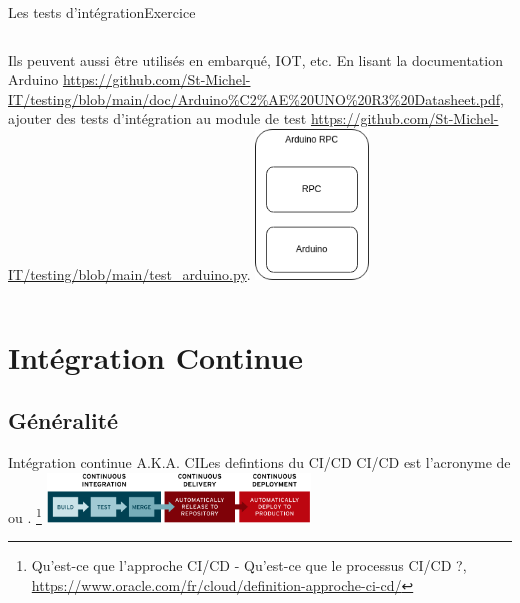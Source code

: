 \documentclass{beamer}
\begin{document}
    \begin{frame}{Les tests d'intégration}{Exercice \execcounterdispinc{}}
        \begin{columns}
            Ils peuvent aussi être utilisés en embarqué, IOT, etc.
            \bigbreak
            En lisant la documentation Arduino  \url{https://github.com/St-Michel-IT/testing/blob/main/doc/Arduino\%C2\%AE\%20UNO\%20R3\%20Datasheet.pdf}, ajouter des tests d'intégration au module de test \url{https://github.com/St-Michel-IT/testing/blob/main/test_arduino.py}.
            \centering
            \includegraphics[width=3cm]{image/arduino-rpc-stack.drawio}
        \end{columns}
    \end{frame}


    \section{Intégration Continue}\label{sec:ci}

    \subsection{Généralité}\label{subsec:ci-general}
    \begin{frame}{Intégration continue A.K.A. CI}{Les defintions du CI/CD}
        \transdissolve
        CI/CD est l'acronyme de  ou .
        \bigbreak
        \footnote{Qu'est-ce que l'approche CI/CD - Qu’est-ce que le processus CI/CD ?, \url{https://www.oracle.com/fr/cloud/definition-approche-ci-cd/}}
        \bigbreak
        \centering
        \includegraphics[width=7cm]{image/ci-cd-flow}
    \end{frame}
\end{document}
